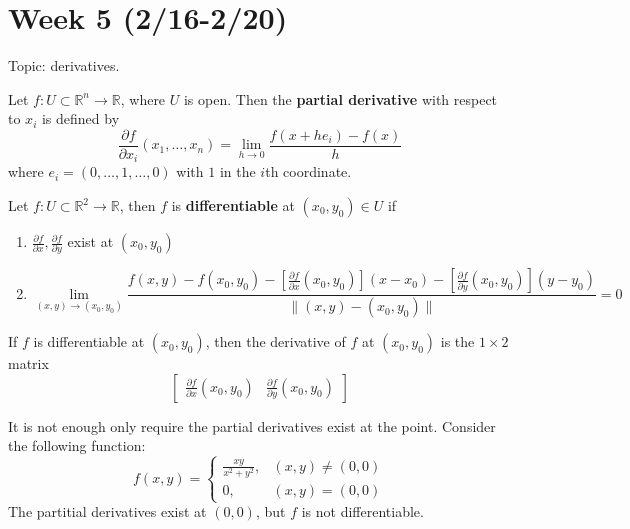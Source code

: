 \documentclass[openany]{book}
\newcommand{\R}{\mathbb{R}}
\begin{document}
\newpage 
\section*{\centering Week 5 (2/16-2/20)}
Topic: derivatives.

\begin{defn}
    Let $f:U\subset\R^n\to\R$, where $U$ is open. Then the \textbf{partial derivative} with respect to $x_i$ is defined by 
    \begin{equation*}
        \frac{\partial f}{\partial x_i}(x_1, \dots, x_n)=\lim_{h\to 0}\frac{f(x+he_i)-f(x)}{h}
    \end{equation*}
    where $e_i=(0,\dots, 1,\dots, 0)$ with $1$ in the $i$th coordinate. 
\end{defn}




\begin{defn}
    Let $f:U\subset\R^2\to\R$, then $f$ is \textbf{differentiable} at $(x_0,y_0)\in U$ if 
    \begin{enumerate}
        \item[(1)] $\frac{\partial f}{\partial x},\frac{\partial f}{\partial y}$ exist at $(x_0,y_0)$
        \item[(2)] 
        \begin{equation*}
            \lim_{(x,y)\to(x_0,y_0)}\frac{f(x,y)-f(x_0,y_0)-\left[\frac{\partial f}{\partial x}(x_0,y_0)\right](x-x_0)-\left[\frac{\partial f}{\partial y}(x_0,y_0)\right](y-y_0)}{\|(x,y)-(x_0,y_0)\|}=0
        \end{equation*}
    \end{enumerate}
    If $f$ is differentiable at $(x_0, y_0)$, then the derivative of $f$ at $(x_0,y_0)$ is the $1\times 2$ matrix 
    \begin{equation*}
        \begin{bmatrix}\frac{\partial f}{\partial x}(x_0,y_0)&\frac{\partial f}{\partial y}(x_0,y_0)\end{bmatrix}
    \end{equation*}
\end{defn}
\begin{warn}
    It is not enough only require the partial derivatives exist at the point. Consider the following function:
    \begin{equation*}
        f(x,y)=\begin{cases}
            \frac{xy}{x^2+y^2}, & (x,y)\neq (0,0)\\
            0, & (x,y)=(0,0)
        \end{cases}
    \end{equation*}
    The partitial derivatives exist at $(0,0)$, but $f$ is not differentiable.
\end{warn}
\end{document}

